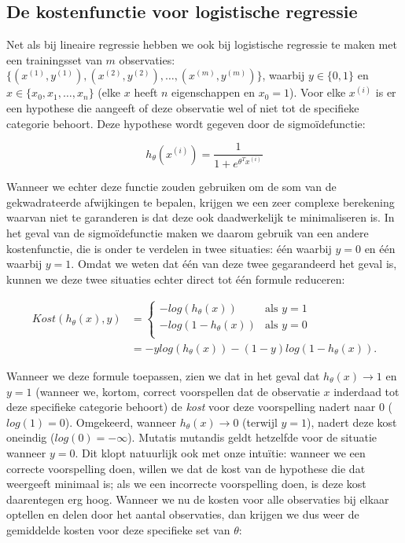 \subsection{De kostenfunctie voor logistische regressie}
Net als bij lineaire regressie hebben we ook bij logistische regressie te maken met een trainingsset van $m$ observaties: $\{(x^{(1)}, y^{(1)}), (x^{(2)}, y^{(2)}), \hdots, (x^{(m)}, y^{(m)})\}$, waarbij $y \in \{0,1\}$ en $x \in \{x_0, x_1, \hdots, x_n\}$ (elke $x$ heeft $n$ eigenschappen en $x_0=1$). Voor elke $x^{(i)}$ is er een hypothese die aangeeft of deze observatie wel of niet tot de specifieke categorie behoort. Deze hypothese wordt gegeven door de sigmoïdefunctie:

\[
h_\theta(x^{(i)}) = \frac{1}{1+e^{\theta^Tx^{(i)}}}
\]

Wanneer we echter deze functie zouden gebruiken om de som van de gekwadrateerde afwijkingen te bepalen, krijgen we een zeer complexe berekening waarvan niet te garanderen is dat deze ook daadwerkelijk te minimaliseren is. In het geval van de sigmoïdefunctie maken we daarom gebruik van een andere kostenfunctie, die is onder te verdelen in twee situaties: één waarbij $y=0$ en één waarbij $y=1$. Omdat we weten dat één van deze twee gegarandeerd het geval is, kunnen we deze twee situaties echter direct tot één formule reduceren:

\[
\begin{aligned}
Kost(h_\theta(x), y) &= 
\begin{cases}
  -log(h_\theta(x)) & \text{als $y=1$} \\
  -log(1-h_\theta(x)) & \text{als $y=0$} \\
\end{cases}\\
&= -ylog(h_\theta(x)) - (1-y)log(1-h_\theta(x)).
\end{aligned}
\]

Wanneer we deze formule toepassen, zien we dat in het geval dat $h_\theta(x) \rightarrow 1$ en $y=1$ (wanneer we, kortom, correct voorspellen dat de observatie $x$ inderdaad tot deze specifieke categorie behoort) de \textit{kost} voor deze voorspelling nadert naar 0 ($log(1)=0$). Omgekeerd, wanneer $h_\theta(x) \rightarrow 0$ (terwijl $y=1$), nadert deze kost oneindig ($log(0)=-\infty$). Mutatis mutandis geldt hetzelfde voor de situatie wanneer $y=0$. Dit klopt natuurlijk ook met onze intuïtie: wanneer we een correcte voorspelling doen, willen we dat de kost van de hypothese die dat weergeeft minimaal is; als we een incorrecte voorspelling doen, is deze kost daarentegen erg hoog. Wanneer we nu de kosten voor alle observaties bij elkaar optellen en delen door het aantal observaties, dan krijgen we dus weer de gemiddelde kosten voor deze specifieke set van $\theta$:

